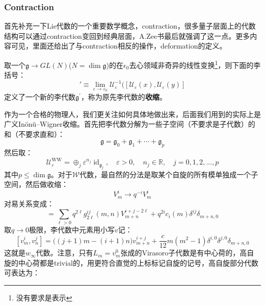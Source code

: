 \subsubsection{Contraction}
首先补充一下Lie代数的一个重要数学概念，contraction，很多量子层面上的代数结构可以通过contraction变回到经典层面，A.Zee\cite{A.Zee}书最后就强调了这一点。更多内容可见\cite{Fialowski_2005}，里面还给出了与contraction相反的操作，deformation的定义。
\begin{definition}[Contraction]
	取一个$\mathfrak{g}\to GL(N)$($N=\dim \mathfrak{g}$)的在$\epsilon_0$去心领域非奇异的线性变换\footnote{没有要求是表示}，则下面的李括号：
	\begin{equation}
		[x,y]'\equiv\lim\limits_{\varepsilon\to\varepsilon_0}\mathcal{U}_\varepsilon^{-1}([\mathcal{U}_\varepsilon(x),\mathcal{U}_\varepsilon(y)]
	\end{equation}
	定义了一个新的李代数$\mathfrak{g}^\prime$，称为原先李代数的\textbf{收缩}。
\end{definition}
作为一个合格的物理人，我们更关注如何具体地做出来，后面我们用到的实际上是广义In\"on\"u\mbox{–}Wigner收缩。首先把李代数分解为一些子空间（不要求是子代数）的和（不要求直和）：
\begin{equation}
	\mathfrak{g}=\mathfrak{g}_0+\mathfrak{g}_1+\cdots+\mathfrak{g}_p
\end{equation}
然后取：
\begin{equation}
	\mathcal{U}_{\varepsilon}^\mathrm{WW}=\oplus_j\varepsilon^{n_j}\operatorname{id}_{\mathfrak{g}_j},\quad\varepsilon>0,\quad n_j\in\mathbb{R},\quad j=0,1,2,\ldots,p
\end{equation}
其中$p\leqslant\dim\mathfrak{g}$。对于$\mathcal{W}$代数，最自然的分法是取某个自旋的所有模单独成一个子空间，然后做收缩：
\begin{equation}
	V_m^i\longrightarrow q^{-i}V_m^i
\end{equation}
对易关系变成：
\begin{equation}
	[V_m^i,V_n^j]=\sum_{\ell>0}q^{2\ell}g_{2\ell}^{ij}(m,n)V_{m+n}^{i+j-2\ell}+q^{2i}c_i(m)\delta^{ij}\delta_{m+n,0}
\end{equation}
取$q\to 0$极限，李代数中元素用小写$v$记：
\begin{equation}\label{w}
	[v_m^i,v_n^j]=\Big((j+1)m-(i+1)n\Big)v_{m+n}^{i+j}+\frac{c}{12}m(m^2-1)\delta^{i,0}\delta^{j,0}\delta_{m+n,0}
\end{equation}
这就是$w_\infty$代数。注意，只有$L_m=v^0_m$张成的Virasoro子代数是有中心荷的，高自旋的中心荷都是trivial的，用更符合直觉的上标标记自旋的记号，高自旋部分代数可表达为：
